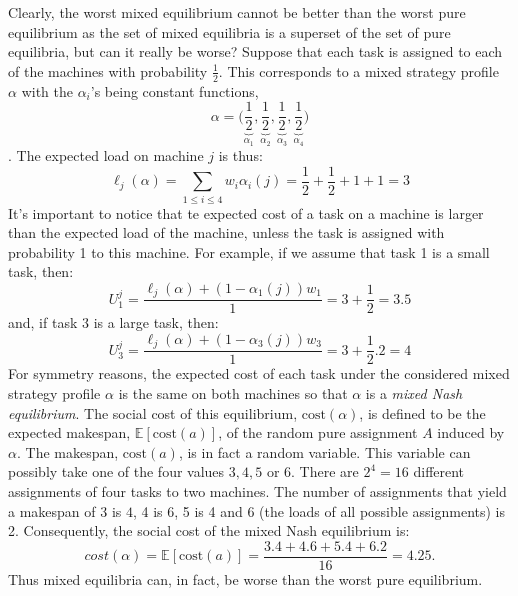 \documentclass[a4paper,11pt]{article}
\newcommand{\E}{{\mathbb E}}
\newcommand{\cost}{\text{cost}}
\begin{document}
Clearly, the worst mixed equilibrium cannot be better than the worst pure equilibrium as the set of mixed equilibria is a superset of the set of pure equilibria, but can it really be worse? Suppose that each task is assigned to each of the machines with probability $\frac{1}{2}$. This corresponds to a mixed strategy profile $\alpha$ with the $\alpha_i$'s being constant functions, $$\alpha = \bigg(\underbrace{\frac{1}{2}}_{\alpha_1}, \underbrace{\frac{1}{2}}_{\alpha_2}, \underbrace{\frac{1}{2}}_{\alpha_3}, \underbrace{\frac{1}{2}}_{\alpha_4}\bigg) $$
. The expected load on machine $j$ is thus:
$$\ell_j(\alpha) = \displaystyle\sum_{1\leq i \leq 4}{w_i\alpha_i(j)} = \frac{1}{2} + \frac{1}{2} + 1 + 1 = 3$$
It's important to notice that te expected cost of a task on a machine is larger than the expected load of the machine, unless the task is assigned with probability 1 to this machine. For example, if we assume that task 1 is a small task, then:
$$U_1^j = \frac{\ell_j(\alpha) + (1 - \alpha_1(j))w_1}{1} = 3 + \frac{1}{2} = 3.5$$
and, if task $3$ is a large task, then:
$$U_3^j = \frac{\ell_j(\alpha) + (1 - \alpha_3(j))w_3}{1} = 3 + \frac{1}{2}.2 = 4$$
For symmetry reasons, the expected cost of each task under the considered mixed strategy profile $\alpha$ is the same on both machines so that $\alpha$ is a \emph{mixed Nash equilibrium}. The social cost of this equilibrium, $\cost(\alpha)$, is defined to be the expected makespan, $\E[\cost(a)]$, of the random pure assignment $A$ induced by $\alpha$. The makespan, $\cost(a)$, is in fact a random variable. This variable can possibly take one of the four values $3, 4, 5$ or $6$. There are $2^4 = 16$ different assignments of four tasks to two machines. The number of assignments that yield a makespan of $3$ is $4$, 4 is 6, 5 is 4 and 6 (the loads of all possible assignments) is 2. Consequently, the social cost of the mixed Nash equilibrium is:
$$cost(\alpha) = \E[\cost(a)] = \frac{3.4 + 4.6 + 5.4+ 6.2}{16} = 4.25.$$
Thus mixed equilibria can, in fact, be worse than the worst pure equilibrium.
\end{document}
